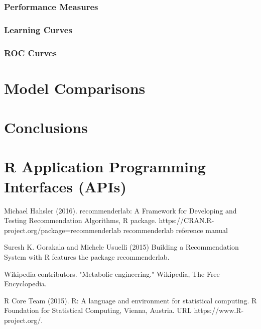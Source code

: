 \subsubsection{Performance Measures}

\subsubsection{Learning Curves}

\subsubsection{ROC Curves}

\section{Model Comparisons}

\section{Conclusions}


\section{R Application Programming Interfaces (APIs)}





\begin{thebibliography}{00}

Michael Hahsler (2016). 
\newblock recommenderlab: A Framework for Developing and Testing Recommendation Algorithms, 
\newblock R package. https://CRAN.R-project.org/package=recommenderlab recommenderlab reference manual

Suresh K. Gorakala and Michele Usuelli (2015) 
\newblock Building a Recommendation System with R features the package recommenderlab.

Wikipedia contributors. 
\newblock "Metabolic engineering." 
\newblock Wikipedia, The Free Encyclopedia.  

R Core Team (2015). 
\newblock R: A language and environment for statistical computing. R Foundation for Statistical Computing, Vienna, Austria.
\newblock URL https://www.R-project.org/.

\end{thebibliography}

